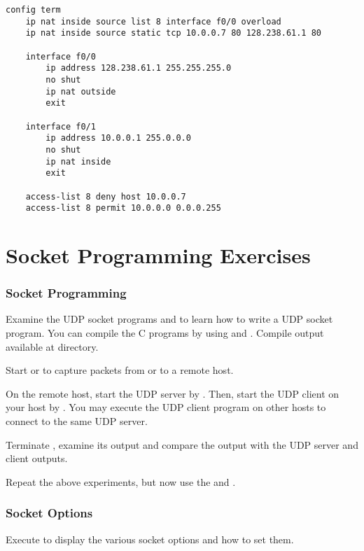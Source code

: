 \documentclass{../UTNetLab}
\begin{document}
    \begin{lstlisting}[language={cisco}, caption={PAT Router Configuration in \hyperref[fig:8.7]{Figure~8.7} (Table~8.6)\label{tab:8.6}}]
config term
    ip nat inside source list 8 interface f0/0 overload
    ip nat inside source static tcp 10.0.0.7 80 128.238.61.1 80

    interface f0/0
        ip address 128.238.61.1 255.255.255.0
        no shut
        ip nat outside
        exit

    interface f0/1
        ip address 10.0.0.1 255.0.0.0
        no shut
        ip nat inside
        exit

    access-list 8 deny host 10.0.0.7
    access-list 8 permit 10.0.0.0 0.0.0.255
    \end{lstlisting}

\part{Socket Programming Exercises}
\section{Socket Programming}
    Examine the UDP socket programs  and  to learn how to write a UDP socket program.
    You can compile the C programs by using  and .
    Compile output available at  directory.

    Start  or  to capture packets from or to a remote host.

    On the remote host, start the UDP server by .
    Then, start the UDP client on your host by .
    You may execute the UDP client program on other hosts to connect to the same UDP server.

    Terminate , examine its output and compare the output with the UDP server and client outputs.

    Repeat the above experiments, but now use the  and .

\section{Socket Options}
    Execute  to display the various socket options and how to set them.
\end{document}
